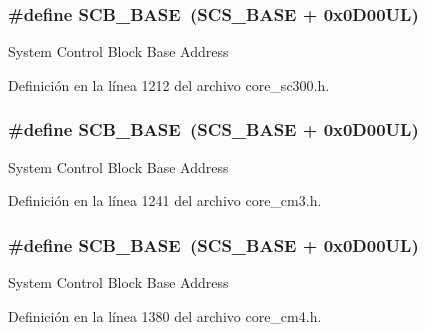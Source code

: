 \subsubsection[{\texorpdfstring{S\+C\+B\+\_\+\+B\+A\+SE}{SCB_BASE}}]{\setlength{\rightskip}{0pt plus 5cm}\#define S\+C\+B\+\_\+\+B\+A\+SE~({\bf S\+C\+S\+\_\+\+B\+A\+SE} +  0x0\+D00\+U\+L)}\hypertarget{group___c_m_s_i_s__core__base_gad55a7ddb8d4b2398b0c1cfec76c0d9fd}{}\label{group___c_m_s_i_s__core__base_gad55a7ddb8d4b2398b0c1cfec76c0d9fd}
System Control Block Base Address 

Definición en la línea 1212 del archivo core\+\_\+sc300.\+h.

\subsubsection[{\texorpdfstring{S\+C\+B\+\_\+\+B\+A\+SE}{SCB_BASE}}]{\setlength{\rightskip}{0pt plus 5cm}\#define S\+C\+B\+\_\+\+B\+A\+SE~({\bf S\+C\+S\+\_\+\+B\+A\+SE} +  0x0\+D00\+U\+L)}\hypertarget{group___c_m_s_i_s__core__base_gad55a7ddb8d4b2398b0c1cfec76c0d9fd}{}\label{group___c_m_s_i_s__core__base_gad55a7ddb8d4b2398b0c1cfec76c0d9fd}
System Control Block Base Address 

Definición en la línea 1241 del archivo core\+\_\+cm3.\+h.

\subsubsection[{\texorpdfstring{S\+C\+B\+\_\+\+B\+A\+SE}{SCB_BASE}}]{\setlength{\rightskip}{0pt plus 5cm}\#define S\+C\+B\+\_\+\+B\+A\+SE~({\bf S\+C\+S\+\_\+\+B\+A\+SE} +  0x0\+D00\+U\+L)}\hypertarget{group___c_m_s_i_s__core__base_gad55a7ddb8d4b2398b0c1cfec76c0d9fd}{}\label{group___c_m_s_i_s__core__base_gad55a7ddb8d4b2398b0c1cfec76c0d9fd}
System Control Block Base Address 

Definición en la línea 1380 del archivo core\+\_\+cm4.\+h.

